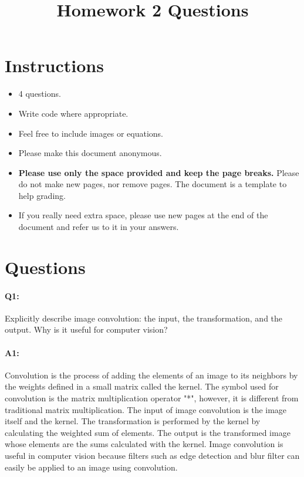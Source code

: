 \title{\vspace{-1cm}Homework 2 Questions}



	\maketitle
	\vspace{-3cm}
	\thispagestyle{fancy}
	
	\section*{Instructions}
	\begin{itemize}
		\item 4 questions.
		\item Write code where appropriate.
		\item Feel free to include images or equations.
		\item Please make this document anonymous.
		\item \textbf{Please use only the space provided and keep the page breaks.} Please do not make new pages, nor remove pages. The document is a template to help grading.
		\item If you really need extra space, please use new pages at the end of the document and refer us to it in your answers.
	\end{itemize}

	\section*{Questions}
	
	\paragraph{Q1:} Explicitly describe image convolution: the input, the transformation, and the output. Why is it useful for computer vision?
	
	\paragraph{A1:} Convolution is the process of adding the elements of an image to its neighbors by the weights defined in a small matrix called the kernel. The symbol used for convolution is the matrix multiplication operator "*", however, it is different from traditional matrix multiplication. The input of image convolution is the image itself and the kernel. The transformation is performed by the kernel by calculating the weighted sum of elements. The output is the transformed image whose elements are the sums calculated with the kernel. Image convolution is useful in computer vision because filters such as edge detection and blur filter can easily be applied to an image using convolution. 
	
